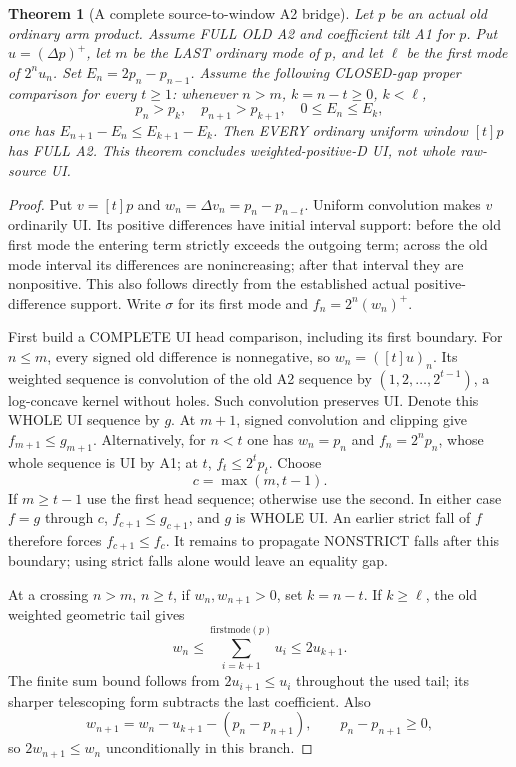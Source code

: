 \documentclass[11pt]{article}
\newtheorem{theorem}[proposition]{Theorem}
\begin{document}
\begin{theorem}[A complete source-to-window A2 bridge]
Let $p$ be an actual old ordinary arm product. Assume FULL OLD A2
and coefficient tilt A1 for $p$. Put $u=(\Delta p)^+$, let $m$ be
the LAST ordinary mode of $p$, and let $\ell$ be the first mode of
$2^nu_n$. Set $E_n=2p_n-p_{n-1}$.
Assume the following CLOSED-gap proper comparison for every $t\ge1$:
whenever $n>m$, $k=n-t\ge0$, $k<\ell$,
\[
 p_n>p_k,\quad p_{n+1}>p_{k+1},\quad 0\le E_n\le E_k,
\]
one has $E_{n+1}-E_n\le E_{k+1}-E_k$.
Then EVERY ordinary uniform window $[t]p$ has FULL A2.
This theorem concludes weighted-positive-D UI, not whole raw-source UI.
\end{theorem}
\begin{proof}
Put $v=[t]p$ and $w_n=\Delta v_n=p_n-p_{n-t}$. Uniform convolution
makes $v$ ordinarily UI. Its positive differences have initial interval
support: before the old first mode the entering term strictly exceeds
the outgoing term; across the old mode interval its differences are
nonincreasing; after that interval they are nonpositive. This also
follows directly from the established actual positive-difference support.
Write $\sigma$ for its first mode and $f_n=2^n(w_n)^+$.

First build a COMPLETE UI head comparison, including its first boundary.
For $n\le m$, every signed old difference is nonnegative, so
$w_n=([t]u)_n$. Its weighted sequence is convolution of the old A2
sequence by $(1,2,\ldots,2^{t-1})$, a log-concave kernel without holes.
Such convolution preserves UI. Denote this WHOLE UI sequence by $g$.
At $m+1$, signed convolution and clipping give $f_{m+1}\le g_{m+1}$.
Alternatively, for $n<t$ one has $w_n=p_n$ and $f_n=2^np_n$,
whose whole sequence is UI by A1; at $t$, $f_t\le2^tp_t$.
Choose
\[
                         c=\max(m,t-1).
\]
If $m\ge t-1$ use the first head sequence; otherwise use the second.
In either case $f=g$ through $c$, $f_{c+1}\le g_{c+1}$, and $g$ is
WHOLE UI. An earlier strict fall of $f$ therefore forces
$f_{c+1}\le f_c$. It remains to propagate NONSTRICT falls after this
boundary; using strict falls alone would leave an equality gap.

At a crossing $n>m$, $n\ge t$, if $w_n,w_{n+1}>0$, set $k=n-t$.
If $k\ge\ell$, the old weighted geometric tail gives
\[
 w_n\le\sum_{i=k+1}^{\mathrm{firstmode}(p)}u_i\le2u_{k+1}.
\]
The finite sum bound follows from $2u_{i+1}\le u_i$ throughout the
used tail; its sharper telescoping form subtracts the last coefficient.
Also
\[
 w_{n+1}=w_n-u_{k+1}-(p_n-p_{n+1}),\qquad p_n-p_{n+1}\ge0,
\]
so $2w_{n+1}\le w_n$ unconditionally in this branch.


\end{proof}
\end{document}
